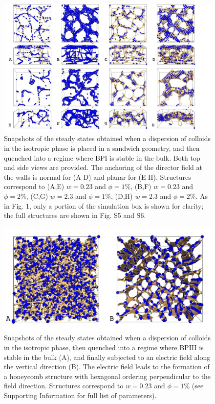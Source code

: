 \documentclass[12pt]{article}
\begin{document}
\begin{figure}
\centerline{\includegraphics[width=\textwidth]{text-fig2.jpg}}
\caption{Snapshots of the steady states obtained when a dispersion of colloids in the isotropic phase is placed in a sandwich geometry, 
and then quenched into a regime where BPI is stable in the bulk. Both top and side views are provided.
The anchoring of the director field at the walls is normal for (A-D) and planar for (E-H). 
Structures correspond to (A,E) $w=0.23$ and $\phi=1\%$, 
(B,F) $w=0.23$ and $\phi=2\%$, 
(C,G) $w=2.3$ and $\phi=1\%$,
(D,H) $w=2.3$ and $\phi=2\%$.
As in Fig. 1, only a portion of the simulation box is shown for clarity;
the full structures are shown in Fig. S5 and S6.}
\end{figure}


\begin{figure}
\centerline{\includegraphics[width=\textwidth]{text-fig3.jpg}}
\caption{Snapshots of the steady states obtained when a dispersion of colloids in the isotropic phase, then quenched into a regime where BPIII is stable in the bulk (A), and finally subjected to an electric field along the vertical direction (B). The electric field leads to the formation of a honeycomb structure with hexagonal ordering perpendicular to the field direction. 
Structures correspond to $w=0.23$ and $\phi=1\%$ (see Supporting Information
for full list of parameters). }
\end{figure}
\end{document}
